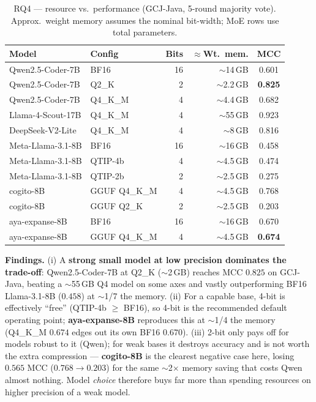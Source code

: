 \documentclass[11pt]{article}
\newcommand{\best}[1]{\textbf{#1}}
\begin{document}
\begin{table}[htbp]
  \centering
  \caption{RQ4 --- resource vs.\ performance (GCJ-Java, 5-round majority vote).
           Approx.\ weight memory assumes the nominal bit-width; MoE rows use
           total parameters.}
  \label{tab:rq4}
  \small
  \begin{tabular}{llrrc}
    \toprule
    \textbf{Model} & \textbf{Config} & \textbf{Bits} & \textbf{$\approx$Wt.\ mem.} & \textbf{MCC} \\
    \midrule
    Qwen2.5-Coder-7B   & BF16       & 16 & $\sim$14\,GB & 0.601 \\
    Qwen2.5-Coder-7B   & Q2\_K      &  2 & $\sim$2.2\,GB & \best{0.825} \\
    Qwen2.5-Coder-7B   & Q4\_K\_M   &  4 & $\sim$4.4\,GB & 0.682 \\
    \midrule
    Llama-4-Scout-17B  & Q4\_K\_M   &  4 & $\sim$55\,GB & 0.923 \\
    DeepSeek-V2-Lite   & Q4\_K\_M   &  4 & $\sim$8\,GB  & 0.816 \\
    \midrule
    Meta-Llama-3.1-8B  & BF16       & 16 & $\sim$16\,GB & 0.458 \\
    Meta-Llama-3.1-8B  & QTIP-4b    &  4 & $\sim$4.5\,GB & 0.474 \\
    Meta-Llama-3.1-8B  & QTIP-2b    &  2 & $\sim$2.5\,GB & 0.275 \\
    \midrule
    cogito-8B          & GGUF Q4\_K\_M &  4 & $\sim$4.5\,GB & 0.768 \\
    cogito-8B          & GGUF Q2\_K    &  2 & $\sim$2.5\,GB & 0.203 \\
    \midrule
    aya-expanse-8B     & BF16       & 16 & $\sim$16\,GB & 0.670 \\
    aya-expanse-8B     & GGUF Q4\_K\_M &  4 & $\sim$4.5\,GB & \best{0.674} \\
    \bottomrule
  \end{tabular}
\end{table}

\noindent\textbf{Findings.} (i) A \textbf{strong small model at low precision
dominates the trade-off}: Qwen2.5-Coder-7B at Q2\_K ($\sim$2\,GB) reaches MCC
$0.825$ on GCJ-Java, beating a $\sim$55\,GB Q4 model on some axes and vastly
outperforming BF16 Llama-3.1-8B ($0.458$) at $\sim$1/7 the memory. (ii) For a
capable base, 4-bit is effectively ``free'' (QTIP-4b $\ge$ BF16), so 4-bit is
the recommended default operating point; \textbf{aya-expanse-8B} reproduces
this at $\sim$1/4 the memory (Q4\_K\_M $0.674$ edges out its own BF16
$0.670$). (iii) 2-bit only pays off for models robust to it (Qwen); for weak
bases it destroys accuracy and is not worth the extra compression ---
\textbf{cogito-8B} is the clearest negative case here, losing $0.565$ MCC
($0.768\!\rightarrow\!0.203$) for the same $\sim$2$\times$ memory saving that
costs Qwen almost nothing. Model \emph{choice} therefore buys far more than
spending resources on higher precision of a weak model.
\end{document}
